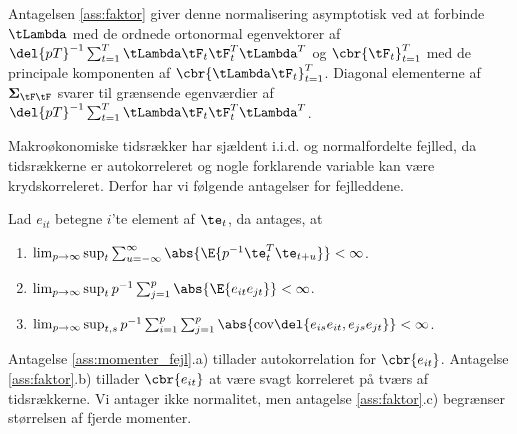 Antagelsen \ref{ass:faktor} giver denne normalisering asymptotisk ved at forbinde \(\tLambda\) med de ordnede ortonormal egenvektorer af \(\del{p T}^{-1} \sum_{t=1}^T \tLambda \tF_t \tF_t^T \tLambda^T\) og \(\cbr{\tF_t}_{t=1}^T\) med de principale komponenten af \(\cbr{\tLambda \tF_t}_{t=1}^T\).
Diagonal elementerne af \(\boldsymbol{\Sigma}_{\tF \tF}\) svarer til grænsende egenværdier af \(\del{p T}^{-1} \sum_{t=1}^T \tLambda \tF_t \tF_t^T \tLambda^T\).

Makroøkonomiske tidsrækker har sjældent i.i.d. og normalfordelte fejlled, da tidsrækkerne er autokorreleret og nogle forklarende variable kan være krydskorreleret. 
Derfor har vi følgende antagelser for fejlleddene.
%
\begin{ass} \label{ass:momenter_fejl}
Lad \(e_{it}\) betegne \(i\)'te element af \(\te_t\), da antages, at
\begin{enumerate}[label=\alph*)]
\item \(\lim_{p \rightarrow \infty} \sup_t \sum_{u = - \infty}^\infty \abs{\E{p^{-1} \te_t^T \te_{t+u}}} < \infty\).
\item \(\lim_{p \rightarrow \infty} \sup_t p^{-1} \sum_{j = 1}^p \abs{\E{e_{it} e_{jt}}} < \infty\).
\item \(\lim_{p \rightarrow \infty} \sup_{t,s} p^{-1} \sum_{i=1}^p \sum_{j=1}^p \abs{\text{cov}\del{e_{is} e_{it}, e_{js} e_{jt}}} < \infty\).
\end{enumerate}
\end{ass}
%
Antagelse \ref{ass:momenter_fejl}.a) tillader autokorrelation for \(\cbr{e_{it}}\).
Antagelse \ref{ass:faktor}.b) tillader \(\cbr{e_{it}}\) at være svagt korreleret på tværs af tidsrækkerne.
Vi antager ikke normalitet, men antagelse \ref{ass:faktor}.c) begrænser størrelsen af fjerde momenter.

